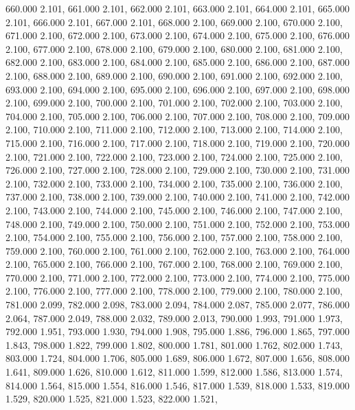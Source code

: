 660.000 2.101, 
661.000 2.101, 
662.000 2.101, 
663.000 2.101, 
664.000 2.101, 
665.000 2.101, 
666.000 2.101, 
667.000 2.101, 
668.000 2.100, 
669.000 2.100, 
670.000 2.100, 
671.000 2.100, 
672.000 2.100, 
673.000 2.100, 
674.000 2.100, 
675.000 2.100, 
676.000 2.100, 
677.000 2.100, 
678.000 2.100, 
679.000 2.100, 
680.000 2.100, 
681.000 2.100, 
682.000 2.100, 
683.000 2.100, 
684.000 2.100, 
685.000 2.100, 
686.000 2.100, 
687.000 2.100, 
688.000 2.100, 
689.000 2.100, 
690.000 2.100, 
691.000 2.100, 
692.000 2.100, 
693.000 2.100, 
694.000 2.100, 
695.000 2.100, 
696.000 2.100, 
697.000 2.100, 
698.000 2.100, 
699.000 2.100, 
700.000 2.100, 
701.000 2.100, 
702.000 2.100, 
703.000 2.100, 
704.000 2.100, 
705.000 2.100, 
706.000 2.100, 
707.000 2.100, 
708.000 2.100, 
709.000 2.100, 
710.000 2.100, 
711.000 2.100, 
712.000 2.100, 
713.000 2.100, 
714.000 2.100, 
715.000 2.100, 
716.000 2.100, 
717.000 2.100, 
718.000 2.100, 
719.000 2.100, 
720.000 2.100, 
721.000 2.100, 
722.000 2.100, 
723.000 2.100, 
724.000 2.100, 
725.000 2.100, 
726.000 2.100, 
727.000 2.100, 
728.000 2.100, 
729.000 2.100, 
730.000 2.100, 
731.000 2.100, 
732.000 2.100, 
733.000 2.100, 
734.000 2.100, 
735.000 2.100, 
736.000 2.100, 
737.000 2.100, 
738.000 2.100, 
739.000 2.100, 
740.000 2.100, 
741.000 2.100, 
742.000 2.100, 
743.000 2.100, 
744.000 2.100, 
745.000 2.100, 
746.000 2.100, 
747.000 2.100, 
748.000 2.100, 
749.000 2.100, 
750.000 2.100, 
751.000 2.100, 
752.000 2.100, 
753.000 2.100, 
754.000 2.100, 
755.000 2.100, 
756.000 2.100, 
757.000 2.100, 
758.000 2.100, 
759.000 2.100, 
760.000 2.100, 
761.000 2.100, 
762.000 2.100, 
763.000 2.100, 
764.000 2.100, 
765.000 2.100, 
766.000 2.100, 
767.000 2.100, 
768.000 2.100, 
769.000 2.100, 
770.000 2.100, 
771.000 2.100, 
772.000 2.100, 
773.000 2.100, 
774.000 2.100, 
775.000 2.100, 
776.000 2.100, 
777.000 2.100, 
778.000 2.100, 
779.000 2.100, 
780.000 2.100, 
781.000 2.099, 
782.000 2.098, 
783.000 2.094, 
784.000 2.087, 
785.000 2.077, 
786.000 2.064, 
787.000 2.049, 
788.000 2.032, 
789.000 2.013, 
790.000 1.993, 
791.000 1.973, 
792.000 1.951, 
793.000 1.930, 
794.000 1.908, 
795.000 1.886, 
796.000 1.865, 
797.000 1.843, 
798.000 1.822, 
799.000 1.802, 
800.000 1.781, 
801.000 1.762, 
802.000 1.743, 
803.000 1.724, 
804.000 1.706, 
805.000 1.689, 
806.000 1.672, 
807.000 1.656, 
808.000 1.641, 
809.000 1.626, 
810.000 1.612, 
811.000 1.599, 
812.000 1.586, 
813.000 1.574, 
814.000 1.564, 
815.000 1.554, 
816.000 1.546, 
817.000 1.539, 
818.000 1.533, 
819.000 1.529, 
820.000 1.525, 
821.000 1.523, 
822.000 1.521, 
